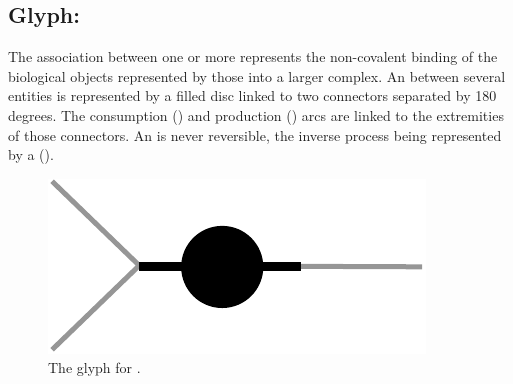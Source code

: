 
\subsection{Glyph: }\label{sec:association}

The association between one or more  represents the non-covalent binding of the biological objects represented by those  into a larger complex. An  between several entities is represented by a filled disc linked to two connectors separated by 180 degrees. The consumption () and production () arcs are linked to the extremities of those connectors. An  is never reversible, the inverse process being represented by a  ().

\begin{figure}[H]
  \centering
  \includegraphics[scale = 0.5]{images/association}
  \caption{The \PD glyph for .}
  \label{fig:association}
\end{figure}
